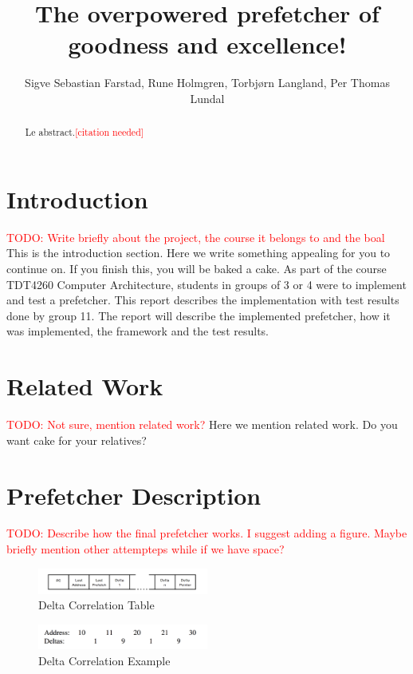 \documentclass[a4paper]{IEEEtran}
\title{The overpowered prefetcher of goodness and excellence!}
\author{
    Sigve Sebastian Farstad,
    Rune Holmgren,
    Torbjørn Langland,
    Per Thomas Lundal
}
\newcommand\TODO[1]{\textcolor{red}{TODO:#1}}
\newcommand\todo[1]{\TODO{#1}}
\newcommand\cn{\textcolor{red}{[citation needed]}}
\begin{document}
\maketitle

\begin{abstract}
    Le abstract.\cn
\end{abstract}

\section{Introduction}

\todo{ Write briefly about the project, the course it belongs to and the boal}
\break
This is the introduction section. Here we write something appealing for you to continue on. If you finish this, you will be baked a cake.
\break
\break
As part of the course TDT4260 Computer Architecture, students in groups of 3 or 4 were to implement and test a prefetcher. This report describes the implementation with test results done by group 11. The report will describe the implemented prefetcher, how it was implemented, the framework and the test results.

\section{Related Work}
\todo{ Not sure, mention related work?}
\break
Here we mention related work. Do you want cake for your relatives?
\section{Prefetcher Description}
\todo{ Describe how the final prefetcher works. I suggest adding a figure. Maybe briefly mention other attempteps while if we have space?}
\break

\begin{figure}[h!]
  \centering
      \includegraphics[width=0.5\textwidth]{Figures/DCTable}
  \caption{Delta Correlation Table}
\end{figure}

\begin{figure}[h!]
  \centering
      \includegraphics[width=0.5\textwidth]{Figures/DCExample}
  \caption{Delta Correlation Example}
\end{figure}
\end{document}

